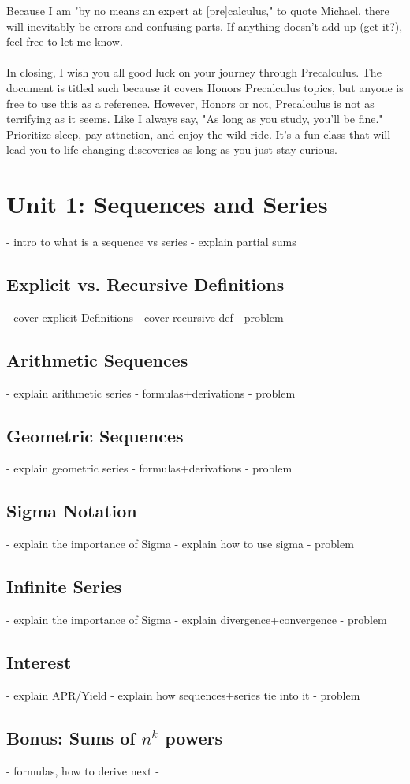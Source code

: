 \documentclass[11pt]{scrartcl}
\begin{document}
Because I am "by no means an expert at [pre]calculus," to quote Michael,
there will inevitably be errors and confusing parts. If anything doesn't
add up (get it?), feel free to let me know. 
\\\\
In closing, I wish you all good luck on your journey through Precalculus. The
document is titled such because it covers Honors Precalculus topics, but anyone
is free to use this as a reference. However, Honors or not, Precalculus is
not as terrifying as it seems. Like I always say, "As long as you study, you'll
be fine." Prioritize sleep, pay attnetion, and enjoy the wild ride. It's a
fun class that will lead you to life-changing discoveries as long as you just stay curious. 

\newpage{}
\section{Unit 1: Sequences and Series}
- intro to what is a sequence vs series
- explain partial sums
\subsection{Explicit vs. Recursive Definitions}
- cover explicit Definitions
- cover recursive def 
- problem
\subsection{Arithmetic Sequences}
- explain arithmetic series
- formulas+derivations
- problem
\subsection{Geometric Sequences}
- explain geometric series
- formulas+derivations
- problem
\subsection{Sigma Notation}
- explain the importance of Sigma
- explain how to use sigma
- problem
\subsection{Infinite Series}
- explain the importance of Sigma
- explain divergence+convergence
- problem
\subsection{Interest}
- explain APR/Yield
- explain how sequences+series tie into it
- problem
\begin{subappendices}
    \subsection{Bonus: Sums of $n^k$ powers}
    - formulas, how to derive next
    - 
\end{subappendices}
\end{document}
